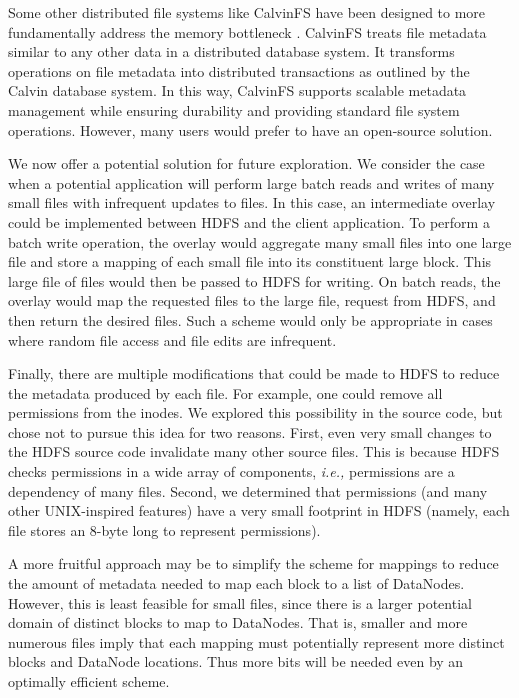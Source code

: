 \documentclass[11pt, a4paper]{article}
\begin{document}
\begin{multicols*}{2}
Some other distributed file systems like CalvinFS have been designed to more fundamentally address the memory bottleneck \cite{CalvinFS}. CalvinFS treats file metadata similar to any other data in a distributed database system. It transforms operations on file metadata into distributed transactions as outlined by the Calvin database system. In this way, CalvinFS supports scalable metadata management while ensuring durability and providing standard file system operations. However, many users would prefer to have an open-source solution.

We now offer a potential solution for future exploration. We consider the case when a potential application will perform large batch reads and writes of many small files with infrequent updates to files. In this case, an intermediate overlay could be implemented between HDFS and the client application. To perform a batch write operation, the overlay would aggregate many small files into one large file and store a mapping of each small file into its constituent large block. This large file of files would then be passed to HDFS for writing. On batch reads, the overlay would map the requested files to the large file, request from HDFS, and then return the desired files. Such a scheme would only be appropriate in cases where random file access and file edits are infrequent.

Finally, there are multiple modifications that could be made to HDFS to reduce the metadata produced by each file. For example, one could remove all permissions from the inodes. We explored this possibility in the source code, but chose not to pursue this idea for two reasons. First, even very small changes to the HDFS source code invalidate many other source files. This is because HDFS checks permissions in a wide array of components, \textit{i.e.,} permissions are a dependency of many files. Second, we determined that permissions (and many other UNIX-inspired features) have a very small footprint in HDFS (namely, each file stores an 8-byte long to represent permissions).

A more fruitful approach may be to simplify the scheme for mappings to reduce the amount of metadata needed to map each block to a list of DataNodes. However, this is least feasible for small files, since there is a larger potential domain of distinct blocks to map to DataNodes. That is, smaller and more numerous files imply that each mapping must potentially represent more distinct blocks and DataNode locations. Thus more bits will be needed even by an optimally efficient scheme.

\end{multicols*}
\end{document}

